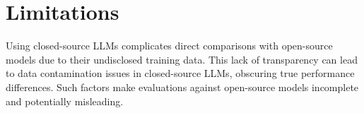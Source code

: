 \documentclass[11pt]{article}
\begin{document}


\section*{Limitations}

Using closed-source LLMs complicates direct comparisons with open-source models due to their undisclosed training data. This lack of transparency can lead to data contamination issues in closed-source LLMs, obscuring true performance differences. Such factors make evaluations against open-source models incomplete and potentially misleading.


\end{document}
